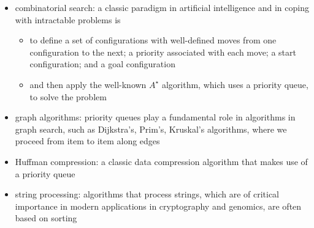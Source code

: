 \documentclass[8pt,a4paper,compress]{beamer}
\begin{document}
\begin{frame}[fragile]
\begin{itemize}
\item combinatorial search: a classic paradigm in artificial intelligence and in coping with intractable problems is
\begin{itemize}
\item to define a set of configurations with well-defined moves from one configuration to the next; a priority associated with each move; a start configuration; and a goal configuration  

\item and then apply the well-known $A^\star$ algorithm, which uses a priority queue, to solve the problem
\end{itemize}

\item graph algorithms: priority queues play a fundamental role in algorithms in graph search, such as Dijkstra's, Prim's, Kruskal's algorithms, where we proceed from item to item along edges

\item Huffman compression: a classic data compression algorithm that makes use of a priority queue

\item string processing: algorithms that process strings, which are of critical importance in modern applications in cryptography and genomics, are often based on sorting
\end{itemize}
\end{frame}
\end{document}
